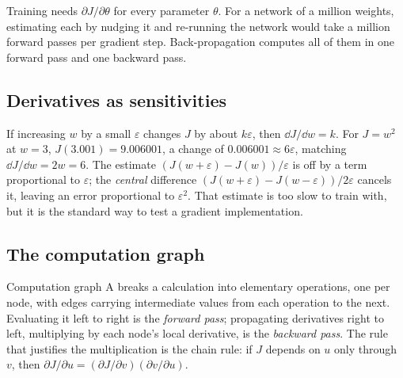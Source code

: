 Training needs $\partial J/\partial\theta$ for every parameter $\theta$. For a
network of a million weights, estimating each by nudging it and re-running the
network would take a million forward passes per gradient step. Back-propagation
computes all of them in one forward pass and one backward pass.

\subsection{Derivatives as sensitivities}

If increasing $w$ by a small $\varepsilon$ changes $J$ by about $k\varepsilon$,
then $\dd J/\dd w = k$. For $J = w^2$ at $w = 3$, $J(3.001) = 9.006001$, a change of
$0.006001 \approx 6\varepsilon$, matching $\dd J/\dd w = 2w = 6$. The estimate
$(J(w+\varepsilon) - J(w))/\varepsilon$ is off by a term proportional to
$\varepsilon$; the \emph{central} difference
$(J(w+\varepsilon) - J(w-\varepsilon))/2\varepsilon$ cancels it, leaving an
error proportional to $\varepsilon^2$. That estimate is too slow to train with,
but it is the standard way to test a gradient implementation.

\subsection{The computation graph}

\begin{defbox}{Computation graph}
A  breaks a calculation into elementary operations, one
per node, with edges carrying intermediate values from each operation to the
next. Evaluating it left to right is the \emph{forward pass}; propagating
derivatives right to left, multiplying by each node's local derivative, is the
\emph{backward pass}. The rule that justifies the multiplication is the chain
rule: if $J$ depends on $u$ only through $v$, then
$\partial J/\partial u = (\partial J/\partial v)(\partial v/\partial u)$.
\end{defbox}

